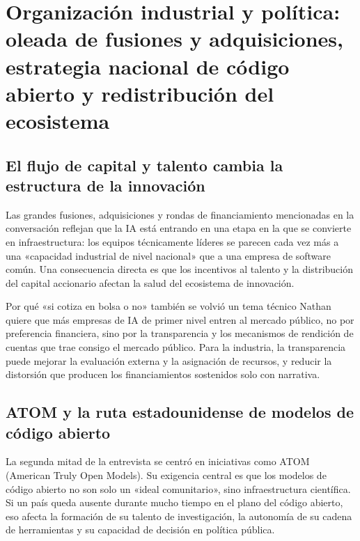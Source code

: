 \section{Organización industrial y política: oleada de fusiones y adquisiciones, estrategia nacional de código abierto y redistribución del ecosistema}

\subsection{El flujo de capital y talento cambia la estructura de la innovación}

Las grandes fusiones, adquisiciones y rondas de financiamiento mencionadas en la conversación reflejan que la IA está entrando en una etapa en la que se convierte en infraestructura: los equipos técnicamente líderes se parecen cada vez más a una «capacidad industrial de nivel nacional» que a una empresa de software común. Una consecuencia directa es que los incentivos al talento y la distribución del capital accionario afectan la salud del ecosistema de innovación.

\begin{knowledgebox}{Por qué «si cotiza en bolsa o no» también se volvió un tema técnico}
Nathan quiere que más empresas de IA de primer nivel entren al mercado público, no por preferencia financiera, sino por la transparencia y los mecanismos de rendición de cuentas que trae consigo el mercado público. Para la industria, la transparencia puede mejorar la evaluación externa y la asignación de recursos, y reducir la distorsión que producen los financiamientos sostenidos solo con narrativa.
\end{knowledgebox}

\subsection{ATOM y la ruta estadounidense de modelos de código abierto}

La segunda mitad de la entrevista se centró en iniciativas como ATOM (American Truly Open Models). Su exigencia central es que los modelos de código abierto no son solo un «ideal comunitario», sino infraestructura científica. Si un país queda ausente durante mucho tiempo en el plano del código abierto, eso afecta la formación de su talento de investigación, la autonomía de su cadena de herramientas y su capacidad de decisión en política pública.

